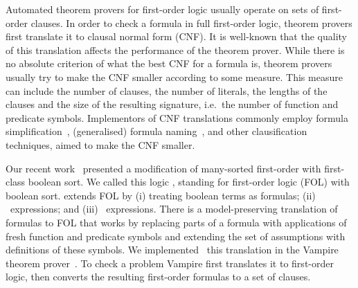 
Automated theorem provers for first-order logic usually operate on sets of first-order clauses. In order to check a formula in full first-order logic, theorem provers first translate it to clausal normal form (CNF). It is well-known that the quality of this translation affects the performance of the theorem prover. While there is no absolute criterion of what the best CNF for a formula is, theorem provers usually try to make the CNF smaller according to some measure. This measure can include the number of clauses, the number of literals, the lengths of the clauses and the size of the resulting signature, i.e.~the number of function and predicate symbols. Implementors of CNF translations commonly employ formula simplification~\cite{nonnengart2001computing}, (generalised) formula naming~\cite{nonnengart2001computing,azmy2013computing}, and other clausification techniques, aimed to make the CNF smaller.

Our recent work~\cite{FOOL} presented a modification of many-sorted first-order with first-class boolean sort. We called this logic \folb{}, standing for first-order logic (FOL) with boolean sort. \folb{} extends FOL by (i) treating boolean terms as formulas; (ii) \ITE\ expressions; and (iii) \LETIN\ expressions. There is a model-preserving translation of \folb{} formulas to FOL that works by replacing parts of a \folb{} formula with applications of fresh function and predicate symbols and extending the set of assumptions with definitions of these symbols. We implemented~\cite{VampireAndFOOL} this translation in the Vampire theorem prover~\cite{Vampire13}. To check a \folb{} problem Vampire first translates it to first-order logic, then converts the resulting first-order formulas to a set of clauses.



